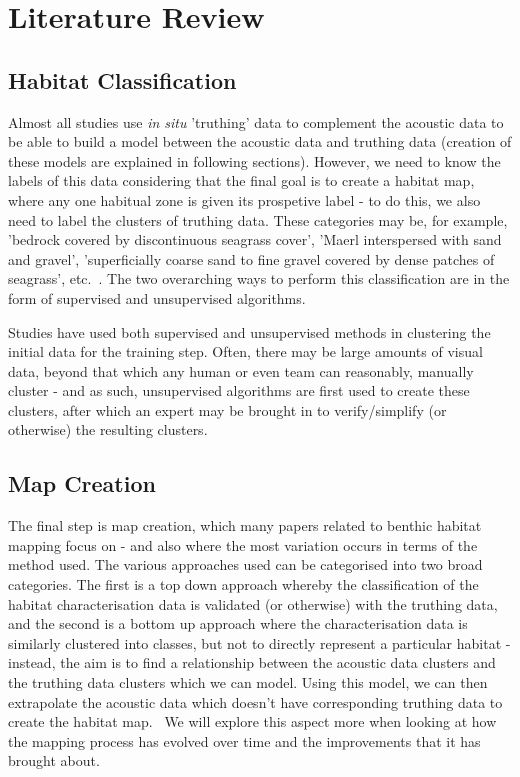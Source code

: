 \chapter{Literature Review} \label{chap:litreview}

            \section{Habitat Classification}

            Almost all studies use \textit{in situ} 'truthing' data to complement the acoustic data to be able to build a model between the acoustic data and truthing data (creation of these models are explained in following sections). However, we need to know the labels of this data considering that the final goal is to create a habitat map, where any one habitual zone is given its prospetive label - to do this, we also need to label the clusters of truthing data. These categories may be, for example, 'bedrock covered by discontinuous seagrass cover', 'Maerl interspersed with sand and gravel', 'superficially coarse sand to fine gravel covered by dense patches of seagrass', etc.~\citep{micallef12}. The two overarching ways to perform this classification are in the form of supervised and unsupervised algorithms.


            Studies have used both supervised and unsupervised methods in clustering the initial data for the training step. Often, there may be large amounts of visual data, beyond that which any human or even team can reasonably, manually cluster - and as such, unsupervised algorithms are first used to create these clusters, after which an expert may be brought in to verify/simplify (or otherwise) the resulting clusters.~\citep*{steinberg11} 

            \section{Map Creation}
            The final step is map creation, which many papers related to benthic habitat mapping focus on - and also where the most variation occurs in terms of the method used. The various approaches used can be categorised into two broad categories. The first is a top down approach whereby the classification of the habitat characterisation data is validated (or otherwise) with the truthing data, and the second is a bottom up approach where the characterisation data is similarly clustered into classes, but not to directly represent a particular habitat - instead, the aim is to find a relationship between the acoustic data clusters and the truthing data clusters which we can model. Using this model, we can then extrapolate the acoustic data which doesn't have corresponding truthing data to create the habitat map.~\citep{ahsan11} We will explore this aspect more when looking at how the mapping process has evolved over time and the improvements that it has brought about.

